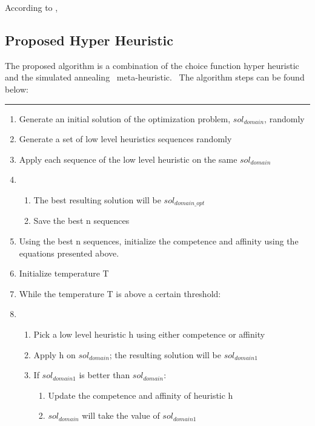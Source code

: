 According to \cite{springer1}, \ %


\subsection{Proposed Hyper Heuristic}
\label{subsec:analysis-proposed-hh}
The proposed algorithm is a combination of the choice function hyper heuristic and the simulated annealing \
meta-heuristic. \
The algorithm steps can be found below: %

\noindent\rule{\textwidth}{1pt}
\begin{enumerate}[itemsep=1pt, parsep=1pt, topsep=1pt]
    \item Generate an initial solution of the optimization problem, $sol_{domain}$, randomly
    \item Generate a set of low level heuristics sequences randomly
    \item Apply each sequence of the low level heuristic on the same $sol_{domain}$
    \item \begin{enumerate}[itemsep=1pt, parsep=1pt, topsep=1pt]
              \item The best resulting solution will be $sol_{domain\_opt}$
              \item Save the best n sequences
    \end{enumerate}
    \item Using the best n sequences, initialize the competence and affinity using the equations presented above. %
    \item Initialize temperature T
    \item While the temperature T is above a certain threshold:
    \item \begin{enumerate}[itemsep=1pt, parsep=1pt, topsep=1pt]
              \item Pick a low level heuristic h using either competence or affinity
              \item Apply h on $sol_{domain}$; the resulting solution will be $sol_{domain1}$
              \item If $sol_{domain1}$ is better than $sol_{domain}$:
              \begin{enumerate}[itemsep=1pt, parsep=1pt, topsep=1pt]
                  \item Update the competence and affinity of heuristic h
                  \item $sol_{domain}$ will take the value of $sol_{domain1}$

\end{enumerate}
\end{enumerate}
\end{enumerate}
